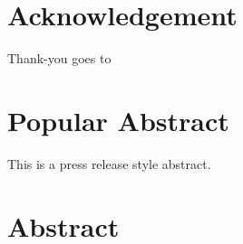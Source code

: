 \documentclass[a4paper,11pt,UKenglish,twoside,openright]{report}\usepackage[]{graphicx}\usepackage[]{color}
\begin{document}

\setcounter{page}{0}

\tableofcontents

\listoftables

\listoffigures



\doublespacing


\chapter*{Acknowledgement}
\label{Ac}

Thank-you goes to


\chapter*{Popular Abstract}
\label{Ab.0}

This is a press release style abstract.


\chapter*{Abstract}
\label{Ab.1}
\end{document}
